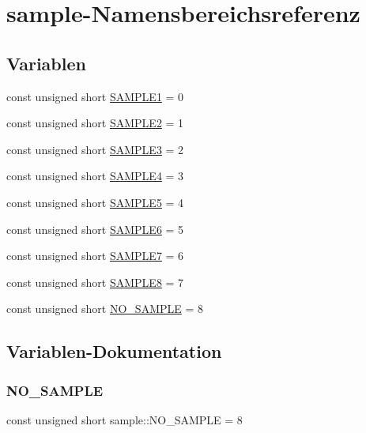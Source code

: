 \hypertarget{namespacesample}{}\section{sample-\/\+Namensbereichsreferenz}
\label{namespacesample}
\subsection*{Variablen}
\begin{DoxyCompactItemize}
\item 
const unsigned short \hyperlink{namespacesample_a59478bc0929eb3127ff4ed573d5abab5}{S\+A\+M\+P\+L\+E1} = 0
\item 
const unsigned short \hyperlink{namespacesample_a74decdde1db22f406d0a0cc1857534f4}{S\+A\+M\+P\+L\+E2} = 1
\item 
const unsigned short \hyperlink{namespacesample_ac0aab16a33bfcdbd978ad2efd28cd85a}{S\+A\+M\+P\+L\+E3} = 2
\item 
const unsigned short \hyperlink{namespacesample_ac15354120ebb7dccc9ba3f548e996148}{S\+A\+M\+P\+L\+E4} = 3
\item 
const unsigned short \hyperlink{namespacesample_ae4dc2e0aefa868bda5be2fcdc695ef4e}{S\+A\+M\+P\+L\+E5} = 4
\item 
const unsigned short \hyperlink{namespacesample_af6cf4e0873f330ffdf8d341aca16d6cc}{S\+A\+M\+P\+L\+E6} = 5
\item 
const unsigned short \hyperlink{namespacesample_ad35669bc942fa6aa53d1d261f7257a3e}{S\+A\+M\+P\+L\+E7} = 6
\item 
const unsigned short \hyperlink{namespacesample_a941e99fc5405e8c43f53d75c486d0819}{S\+A\+M\+P\+L\+E8} = 7
\item 
const unsigned short \hyperlink{namespacesample_aa6106026bc40989292431c65c348a659}{N\+O\+\_\+\+S\+A\+M\+P\+LE} = 8
\end{DoxyCompactItemize}


\subsection{Variablen-\/\+Dokumentation}
\mbox{\label{namespacesample_aa6106026bc40989292431c65c348a659}} 
\subsubsection{\texorpdfstring{N\+O\+\_\+\+S\+A\+M\+P\+LE}{NO\_SAMPLE}}
{\footnotesize\ttfamily const unsigned short sample\+::\+N\+O\+\_\+\+S\+A\+M\+P\+LE = 8}



